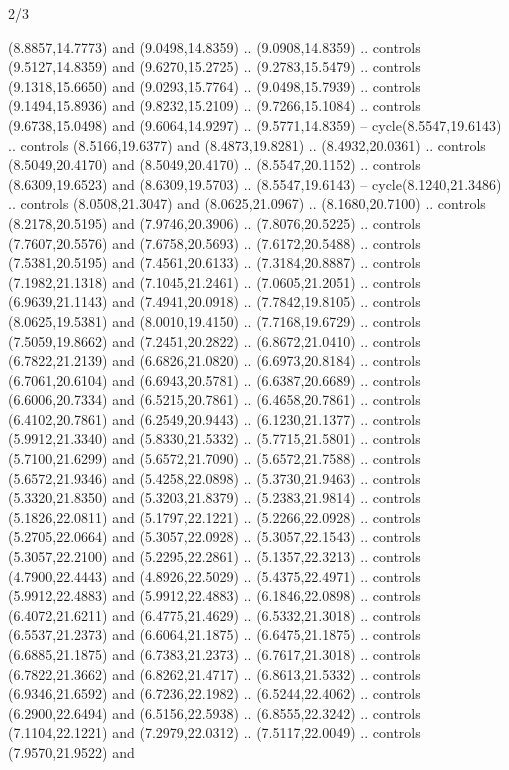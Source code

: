 \begin{flagdescription}{2/3}
\begin{scope}[yshift=\flagwidth,scale=\flagwidth/1241.93737]
\begin{scope}[y=-1mm, x=1mm,draw=gold,fill=blue,line join=miter,miter limit=4,line width=1.8\lw]
{  (8.8857,14.7773) and (9.0498,14.8359) .. (9.0908,14.8359) .. controls
  (9.5127,14.8359) and (9.6270,15.2725) .. (9.2783,15.5479) .. controls
  (9.1318,15.6650) and (9.0293,15.7764) .. (9.0498,15.7939) .. controls
  (9.1494,15.8936) and (9.8232,15.2109) .. (9.7266,15.1084) .. controls
  (9.6738,15.0498) and (9.6064,14.9297) .. (9.5771,14.8359) --
  cycle(8.5547,19.6143) .. controls (8.5166,19.6377) and (8.4873,19.8281) ..
  (8.4932,20.0361) .. controls (8.5049,20.4170) and (8.5049,20.4170) ..
  (8.5547,20.1152) .. controls (8.6309,19.6523) and (8.6309,19.5703) ..
  (8.5547,19.6143) -- cycle(8.1240,21.3486) .. controls (8.0508,21.3047) and
  (8.0625,21.0967) .. (8.1680,20.7100) .. controls (8.2178,20.5195) and
  (7.9746,20.3906) .. (7.8076,20.5225) .. controls (7.7607,20.5576) and
  (7.6758,20.5693) .. (7.6172,20.5488) .. controls (7.5381,20.5195) and
  (7.4561,20.6133) .. (7.3184,20.8887) .. controls (7.1982,21.1318) and
  (7.1045,21.2461) .. (7.0605,21.2051) .. controls (6.9639,21.1143) and
  (7.4941,20.0918) .. (7.7842,19.8105) .. controls (8.0625,19.5381) and
  (8.0010,19.4150) .. (7.7168,19.6729) .. controls (7.5059,19.8662) and
  (7.2451,20.2822) .. (6.8672,21.0410) .. controls (6.7822,21.2139) and
  (6.6826,21.0820) .. (6.6973,20.8184) .. controls (6.7061,20.6104) and
  (6.6943,20.5781) .. (6.6387,20.6689) .. controls (6.6006,20.7334) and
  (6.5215,20.7861) .. (6.4658,20.7861) .. controls (6.4102,20.7861) and
  (6.2549,20.9443) .. (6.1230,21.1377) .. controls (5.9912,21.3340) and
  (5.8330,21.5332) .. (5.7715,21.5801) .. controls (5.7100,21.6299) and
  (5.6572,21.7090) .. (5.6572,21.7588) .. controls (5.6572,21.9346) and
  (5.4258,22.0898) .. (5.3730,21.9463) .. controls (5.3320,21.8350) and
  (5.3203,21.8379) .. (5.2383,21.9814) .. controls (5.1826,22.0811) and
  (5.1797,22.1221) .. (5.2266,22.0928) .. controls (5.2705,22.0664) and
  (5.3057,22.0928) .. (5.3057,22.1543) .. controls (5.3057,22.2100) and
  (5.2295,22.2861) .. (5.1357,22.3213) .. controls (4.7900,22.4443) and
  (4.8926,22.5029) .. (5.4375,22.4971) .. controls (5.9912,22.4883) and
  (5.9912,22.4883) .. (6.1846,22.0898) .. controls (6.4072,21.6211) and
  (6.4775,21.4629) .. (6.5332,21.3018) .. controls (6.5537,21.2373) and
  (6.6064,21.1875) .. (6.6475,21.1875) .. controls (6.6885,21.1875) and
  (6.7383,21.2373) .. (6.7617,21.3018) .. controls (6.7822,21.3662) and
  (6.8262,21.4717) .. (6.8613,21.5332) .. controls (6.9346,21.6592) and
  (6.7236,22.1982) .. (6.5244,22.4062) .. controls (6.2900,22.6494) and
  (6.5156,22.5938) .. (6.8555,22.3242) .. controls (7.1104,22.1221) and
  (7.2979,22.0312) .. (7.5117,22.0049) .. controls (7.9570,21.9522) and
}
\end{scope}
\end{scope}
\end{flagdescription}
